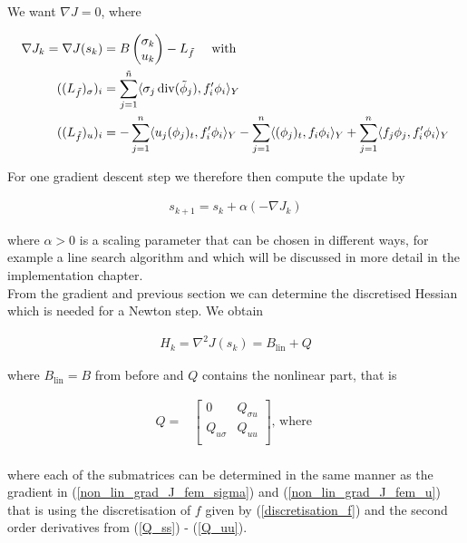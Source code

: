 \documentclass[../draft_1.tex]{subfiles}
\begin{document}
We want $\nabla J = 0$, where

\begin{ceqn}
	\begin{align}
		\nabla J_k = \nabla J(s_k) &= B \begin{pmatrix}
	\sigma_k \\
	u_k
	\end{pmatrix} - L_{\tilde{f}} \quad \text{ with } \\
	\label{non_lin_grad_J_fem_sigma}
 ((L_{\tilde{f}})_{\sigma})_i &= \sum_{j=1}^{\tilde{n}} \langle \sigma_j \mathop{}\!\mathrm{div}(\tilde{\phi}_j), f'_i \phi_i \rangle_Y \\
 	\label{non_lin_grad_J_fem_u}
  ((L_{\tilde{f}})_{u})_i &= - \sum_{j=1}^n \langle u_j (\phi_j)_t, f'_i \phi_i \rangle_Y - \sum_{j=1}^{n} \langle (\phi_j)_t, f_i \phi_i \rangle_Y  + \sum_{j=1}^n \langle f_j \phi_j, f'_i \phi_i \rangle_Y \\
	\end{align}
\end{ceqn}
For one gradient descent step we therefore then compute the update by 
\begin{ceqn}
	\begin{align}
s_{k+1} = s_k + \alpha (-\nabla J_k)
	\end{align}
\end{ceqn}
where $\alpha > 0$ is a scaling parameter that can be chosen in different ways, for example a line search algorithm and which will be discussed in more detail in the implementation chapter. 
\smallskip
\\
From the gradient and previous section we can determine the discretised Hessian which is needed for a Newton step. We obtain 
\begin{ceqn}
	\begin{align}
	H_k = \nabla^2 J(s_k) = B_{\text{lin}} + Q
	\end{align}
\end{ceqn}
where $B_{\text{lin}} = B$ from before and $Q$ contains the nonlinear part, that is
\begin{ceqn}
	\begin{align}
	Q =& 
	\begin{bmatrix}
	0 &  Q_{\sigma u}  \\
	 Q_{u \sigma}  &    Q_{uu} \\
	\end{bmatrix}  \text{, where } \\
		\end{align}
\end{ceqn}
where each of the submatrices can be determined in the same manner as the gradient in (\ref{non_lin_grad_J_fem_sigma}) and (\ref{non_lin_grad_J_fem_u}) that is using the discretisation of $f$ given by (\ref{discretisation_f}) and the second order derivatives from (\ref{Q_ss}) - (\ref{Q_uu}).
\end{document}
